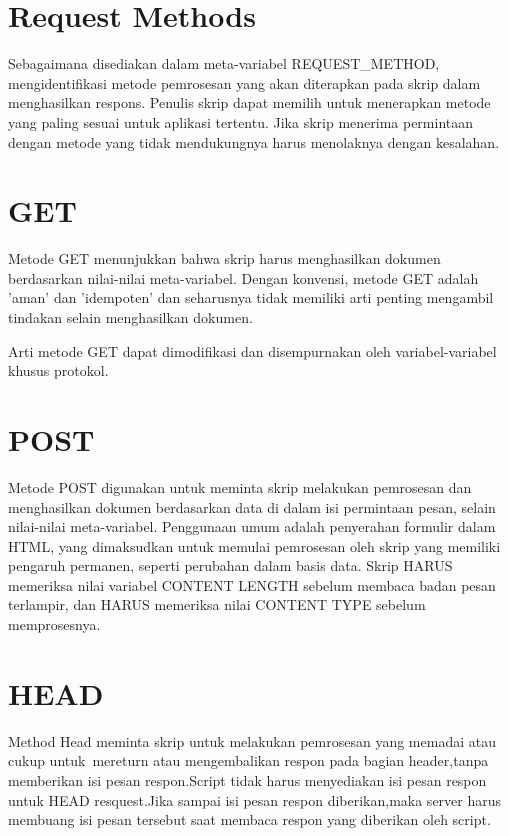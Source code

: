 \documentclass{article}
\begin{document}
\section{Request Methods}
Sebagaimana disediakan dalam meta-variabel REQUEST_METHOD, mengidentifikasi metode pemrosesan yang akan diterapkan pada skrip dalam menghasilkan respons. Penulis skrip dapat memilih untuk menerapkan metode yang paling sesuai untuk aplikasi tertentu. Jika skrip menerima permintaan dengan metode yang tidak mendukungnya harus menolaknya dengan kesalahan.

\section{GET}
Metode GET menunjukkan bahwa skrip harus menghasilkan dokumen berdasarkan nilai-nilai meta-variabel. Dengan konvensi, metode GET adalah 'aman' dan 'idempoten' dan seharusnya tidak memiliki arti penting mengambil tindakan selain menghasilkan dokumen.

Arti metode GET dapat dimodifikasi dan disempurnakan oleh variabel-variabel khusus protokol.

\section{POST}
Metode POST digunakan untuk meminta skrip melakukan pemrosesan dan menghasilkan dokumen berdasarkan data di dalam isi permintaan pesan, selain nilai-nilai meta-variabel. Penggunaan umum adalah penyerahan formulir dalam HTML, yang dimaksudkan untuk memulai pemrosesan oleh skrip yang memiliki pengaruh permanen, seperti perubahan dalam basis data.
Skrip HARUS memeriksa nilai variabel CONTENT LENGTH sebelum membaca badan pesan terlampir, dan HARUS memeriksa nilai CONTENT TYPE sebelum memprosesnya.
\section{HEAD}
Method Head meminta skrip untuk melakukan pemrosesan yang memadai atau cukup untuk mereturn atau mengembalikan respon pada bagian header,tanpa memberikan isi pesan respon.Script tidak harus menyediakan isi pesan respon untuk HEAD resquest.Jika sampai isi pesan respon diberikan,maka server harus membuang isi pesan tersebut saat membaca respon yang diberikan oleh script.
\end{document}

